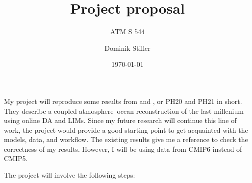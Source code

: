 \documentclass[parskip=half,DIV=14,bookmarkpackage=false]{scrartcl}
\title{Project proposal}
\subtitle{ATM S 544}
\author{Dominik Stiller}
\date{\today}
\begin{document}
\maketitle



My project will reproduce some results from \textcite{Perkins2020} and \textcite{Perkins2021}, or PH20 and PH21 in short. They describe a coupled atmosphere--ocean reconstruction of the last millenium using online \gls{DA} and \glspl{LIM}. Since my future research will continue this line of work, the project would provide a good starting point to get acquainted with the models, data, and workflow. The existing results give me a reference to check the correctness of my results. However, I will be using data from CMIP6 instead of CMIP5.

The project will involve the following steps:
\end{document}
